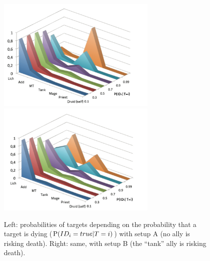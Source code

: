 \begin{figure}[h!]
\begin{center}
\includegraphics[width=7.8cm]{images/wow_distrib_target1.png} \includegraphics[width=7.8cm]{images/wow_distrib_target2.png}
\caption{Left: probabilities of targets depending on the probability that a target is dying ($\mathrm{P}(ID_i=true | T=i)$) with setup A (no ally is risking death). Right: same, with setup B (the ``tank'' ally is risking death).}
\label{fig:wow_target}
\end{center}
\end{figure}
